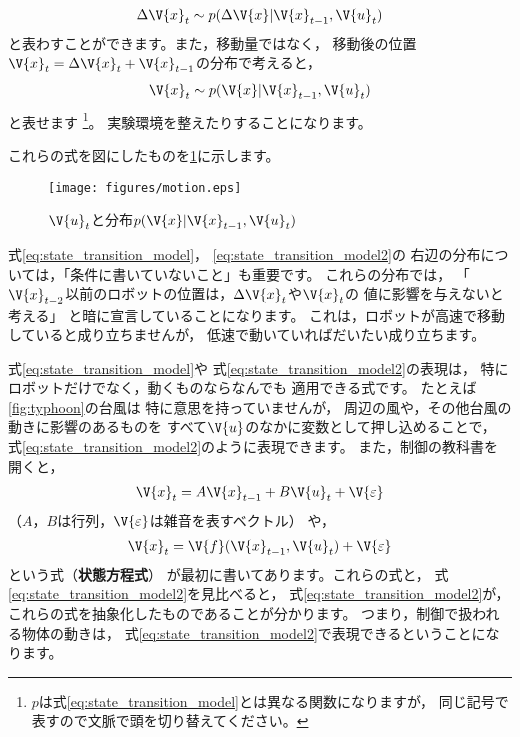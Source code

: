 \begin{align}
	\Delta \V{x}_t \sim p( \Delta\V{x} | \V{x}_{t-1}, \V{u}_t) \label{eq:state_transition_model}
\end{align}
と表わすことができます。また，移動量ではなく，
移動後の位置$\V{x}_t = \Delta \V{x}_t + \V{x}_{t-1}$の分布で考えると，
\begin{align}
	\V{x}_t \sim p( \V{x} | \V{x}_{t-1}, \V{u}_t) \label{eq:state_transition_model2}
\end{align}
と表せます
\footnote{
	$p$は式\ref{eq:state_transition_model}とは異なる関数になりますが，
	同じ記号で表すので文脈で頭を切り替えてください。
}。
実験環境を整えたりすることになります。

これらの式を図にしたものを\ref{fig:motion}に示します。

\begin{figure}[hbt]
 \centering
  \texttt{[image: figures/motion.eps]}
	\caption{$\V{u}_t$と分布$p(\V{x} | \V{x}_{t-1}, \V{u}_t)$}
  \label{fig:motion}
\end{figure}

式\ref{eq:state_transition_model}，
\ref{eq:state_transition_model2}の
右辺の分布については，「条件に書いていないこと」も重要です。
これらの分布では，
「$\V{x}_{t-2}$以前のロボットの位置は，$\Delta \V{x}_t$や$\V{x}_t$の
値に影響を与えないと考える」
と暗に宣言していることになります。
これは，ロボットが高速で移動していると成り立ちませんが，
低速で動いていればだいたい成り立ちます。


式\ref{eq:state_transition_model}や
式\ref{eq:state_transition_model2}の表現は，
特にロボットだけでなく，動くものならなんでも
適用できる式です。
たとえば\ref{fig:typhoon}の台風は
特に意思を持っていませんが，
周辺の風や，その他台風の動きに影響のあるものを
すべて$\V{u}$のなかに変数として押し込めることで，
式\ref{eq:state_transition_model2}のように表現できます。
また，制御の教科書を開くと，
\begin{align}
	\V{x}_t = A \V{x}_{t-1} + B \V{u}_t + \V{\varepsilon}\label{eq:state_equation_linear}
\end{align}
（$A$，$B$は行列，$\V{\varepsilon}$は雑音を表すベクトル）
や，
\begin{align}
	\V{x}_t = \V{f}( \V{x}_{t-1}, \V{u}_t) + \V{\varepsilon} \label{eq:state_equation_nonlinear}
\end{align}
という式（\textbf{状態方程式}）
が最初に書いてあります。これらの式と，
式\ref{eq:state_transition_model2}を見比べると，
式\ref{eq:state_transition_model2}が，
これらの式を抽象化したものであることが分かります。
つまり，制御で扱われる物体の動きは，
式\ref{eq:state_transition_model2}で表現できるということになります。
